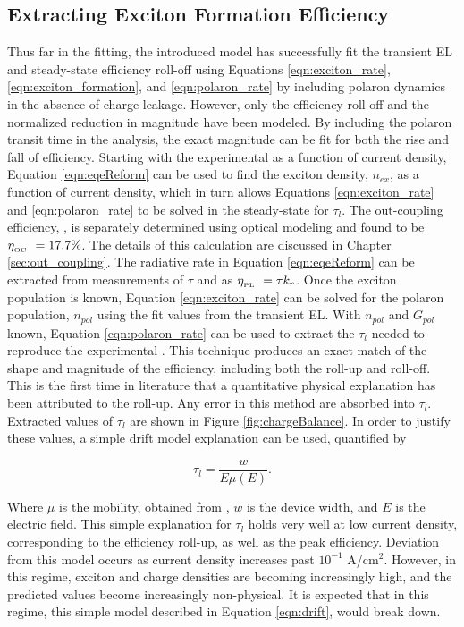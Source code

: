 \documentclass[../thesis.tex]{subfiles}
\begin{document}
\subsection{Extracting Exciton Formation Efficiency}

Thus far in the fitting, the introduced model has successfully fit the transient EL and steady-state efficiency roll-off using Equations \ref{eqn:exciton_rate},\ref{eqn:exciton_formation}, and \ref{eqn:polaron_rate} by including polaron dynamics in the absence of charge leakage.
However, only the efficiency roll-off and the normalized reduction in magnitude have been modeled. 
By including the polaron transit time in the analysis, the exact magnitude can be fit for both the rise and fall of efficiency. 
Starting with the experimental \eqe as a function of current density, Equation \ref{eqn:eqeReform} can be used to find the exciton density, $n_{ex}$, as a function of current density, which in turn allows Equations \ref{eqn:exciton_rate} and \ref{eqn:polaron_rate} to be solved in the steady-state for $\tau_l$.  
The out-coupling efficiency, \oc, is separately determined using optical modeling and found to be $\eta_{_\text{\tiny OC}}\ =17.7\%$.\supercite{Furno2010,Furno2012}  
The details of this calculation are discussed in Chapter \ref{sec:out_coupling}.
The radiative rate in Equation \ref{eqn:eqeReform} can be extracted from measurements of $\tau$ and \pl as $\eta_{_\text{\tiny PL}}\ =\tau k_r$.  Once the exciton population is known, Equation \ref{eqn:exciton_rate} can be solved for the polaron population, $n_{pol}$ using the fit values from the transient EL.  With $n_{pol}$ and $G_{pol}$ known, Equation \ref{eqn:polaron_rate} can be used to extract the $\tau_l$ needed to reproduce the experimental \eqe.  
This technique produces an exact match of the shape and magnitude of the efficiency, including both the roll-up and roll-off.
This is the first time in literature that a quantitative physical explanation has been attributed to the roll-up.
Any error in this method are absorbed into $\tau_l$.
Extracted values of $\tau_l$ are shown in Figure \ref{fig:chargeBalance}.
In order to justify these values, a simple drift model explanation can be used, quantified by

\begin{equation}
\tau_l=\frac{w}{E\mu(E)}.
\label{eqn:drift}
\end{equation}

Where $\mu$ is the mobility, obtained from \textcite{Parshin2006}, $w$ is the device width, and $E$ is the electric field.  
This simple explanation for $\tau_l$ holds very well at low current density, corresponding to the efficiency roll-up, as well as the peak efficiency.  
Deviation from this model occurs as current density increases past $10^{-1}$ A/cm$^2$.  
However, in this regime, exciton and charge densities are becoming increasingly high, and the predicted values become increasingly non-physical.
It is expected that in this regime, this simple model described in Equation \ref{eqn:drift}, would break down.
\end{document}

